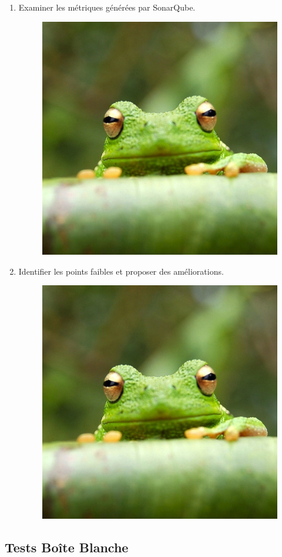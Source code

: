 \documentclass{article}
\begin{document}
\begin{enumerate}
    \item Examiner les métriques générées par SonarQube.
    \begin{figure}[H]
        \centering
        \includegraphics[width=0.5\linewidth]{assets/frog.jpg}
        \end{figure}
    \item Identifier les points faibles et proposer des améliorations.
    \begin{figure}[H]
        \centering
        \includegraphics[width=0.5\linewidth]{assets/frog.jpg}
        \end{figure}
\end{enumerate}

\subsection{Tests Boîte Blanche}
\end{document}

